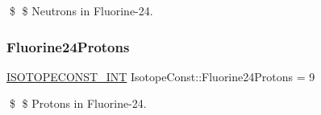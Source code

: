 \$ \$ Neutrons in Fluorine-\/24. \mbox{\label{group___isotope_const-_fluorine-_f24_gac5e7212be261da3a6899fdb7e0c0300c}} 
\subsubsection{\texorpdfstring{Fluorine24\+Protons}{Fluorine24Protons}}
{\footnotesize\ttfamily \mbox{\hyperlink{group___isotope_const-_macros_ga5f18360b3e99483a35c32d789e62621c}{I\+S\+O\+T\+O\+P\+E\+C\+O\+N\+S\+T\+\_\+\+I\+NT}} Isotope\+Const\+::\+Fluorine24\+Protons = 9}

\$ \$ Protons in Fluorine-\/24. 